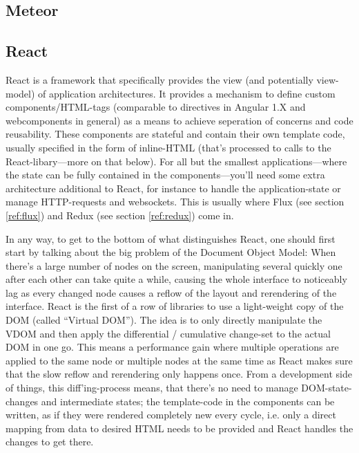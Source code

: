 \subsection{Meteor}


\subsection{React}

React is a framework that specifically provides the view (and potentially view-model) of application architectures. It provides a mechanism to define custom components/HTML-tags (comparable to directives in Angular 1.X and webcomponents in general) as a means to achieve seperation of concerns and code reusability. These components are stateful and contain their own template code, usually specified in the form of inline-HTML (that's processed to calls to the React-libary---more on that
below). %
For all but the smallest applications---where the state can be fully contained in the components---you'll need some extra architecture additional to React, for instance to handle the application-state or manage HTTP-requests and websockets. This is usually where Flux (see section \ref{ref:flux}) and Redux (see section \ref{ref:redux}) come in.

In any way, to get to the bottom of what distinguishes React, one should first start by talking about the big problem of the Document Object Model: When there's a large number of nodes on the screen, manipulating several quickly one after each other can take quite a while, causing the whole interface to noticeably lag as every changed node causes a reflow of the layout and rerendering of the interface. React is the first of a row of libraries to use a light-weight copy of the DOM (called ``Virtual DOM''). The idea is to only directly manipulate the VDOM and then apply
the differential / cumulative change-set to the actual DOM in one go. This means a performance gain where multiple operations are applied to the same node or multiple nodes at the same time as React makes sure that the slow reflow and rerendering only happens once. From a development side of things, this diff'ing-process means, that there's no need to manage DOM-state-changes and intermediate states; the template-code in the components can be written, as if they were rendered completely new every cycle, i.e. only a direct
mapping from data to desired HTML needs to be provided and React handles the changes to get there.

